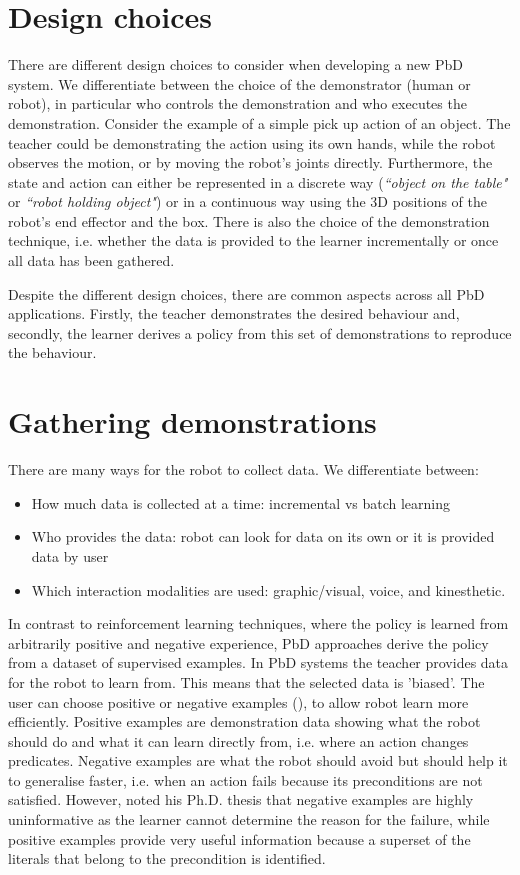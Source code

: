 \section{Design choices}
There are different design choices to consider when developing a new PbD system.
We differentiate between the choice of the demonstrator (human or robot), in particular who controls the demonstration and who executes the demonstration.
 Consider the example of a simple pick up action of an object.
 The teacher could be demonstrating the action using its own hands, while the robot observes the motion, or by moving the robot's joints directly.
 Furthermore, the state and action can either be represented in a discrete way (\textit{``object on the table"} or \textit{``robot holding object"}) or in a continuous way using the 3D positions of the robot's end effector and the box.
 There is also the choice of the demonstration technique, i.e. whether the data is provided to the learner incrementally or once all data has been gathered.
 
Despite the different design choices, there are common aspects across all PbD applications. Firstly, the teacher demonstrates the desired behaviour and, secondly, the learner derives a policy from this set of demonstrations to reproduce the behaviour.

\section{Gathering demonstrations} \label{subsec:Gathering demonstrations}
There are many ways for the robot to collect data.
 We differentiate between:
\begin{itemize}
    \item How much data is collected at a time: incremental vs batch learning
    \item Who provides the data: robot can look for data on its own or it is provided data by user
    \item Which interaction modalities are used: graphic/visual, voice, and kinesthetic. 
\end{itemize}

In contrast to reinforcement learning techniques, where the policy is learned from arbitrarily positive and negative experience, PbD approaches derive the policy from a dataset of supervised examples.
In PbD systems the teacher provides data for the robot to learn from.
This means that the selected data is 'biased'. 
The user can choose positive or negative examples (\cite{grollman2012robot}), to allow robot learn more efficiently.
Positive examples are demonstration data showing what the robot should do and what it can learn directly from, i.e. where an action changes predicates.
Negative examples are what the robot should avoid but should help it to generalise faster, i.e. when an action fails because its preconditions are not satisfied.
However, \cite{walsh2010efficient} noted his Ph.D. thesis that negative examples are highly uninformative as the learner cannot determine the reason for the failure, while positive examples provide very useful information because a superset of the literals that belong to the precondition is identified.


